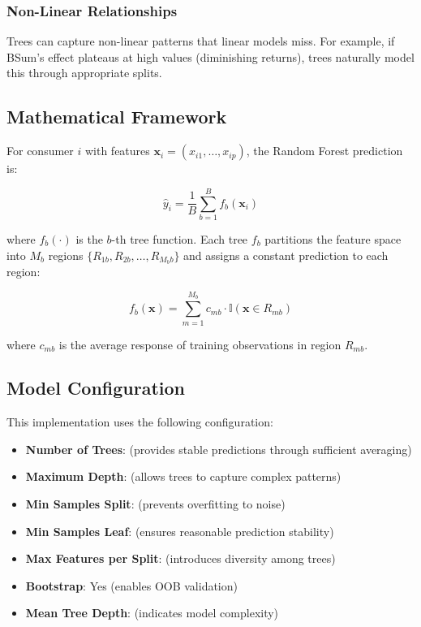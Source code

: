 \subsubsection{Non-Linear Relationships}

Trees can capture non-linear patterns that linear models miss. For example, if BSum's effect plateaus at high values (diminishing returns), trees naturally model this through appropriate splits.

\subsection{Mathematical Framework}

For consumer $i$ with features $\mathbf{x}_i = (x_{i1}, \ldots, x_{ip})$, the Random Forest prediction is:

\begin{equation}
\hat{y}_i = \frac{1}{B} \sum_{b=1}^{B} f_b(\mathbf{x}_i)
\end{equation}

where $f_b(\cdot)$ is the $b$-th tree function. Each tree $f_b$ partitions the feature space into $M_b$ regions $\{R_{1b}, R_{2b}, \ldots, R_{M_b b}\}$ and assigns a constant prediction to each region:

\begin{equation}
f_b(\mathbf{x}) = \sum_{m=1}^{M_b} c_{mb} \cdot \mathbb{I}(\mathbf{x} \in R_{mb})
\end{equation}

where $c_{mb}$ is the average response of training observations in region $R_{mb}$.

\subsection{Model Configuration}

This implementation uses the following configuration:

\begin{itemize}
    \item \textbf{Number of Trees}: \ModelNineNTrees{} (provides stable predictions through sufficient averaging)
    \item \textbf{Maximum Depth}: \ModelNineMaxDepth{} (allows trees to capture complex patterns)
    \item \textbf{Min Samples Split}: \ModelNineMinSamplesSplit{} (prevents overfitting to noise)
    \item \textbf{Min Samples Leaf}: \ModelNineMinSamplesLeaf{} (ensures reasonable prediction stability)
    \item \textbf{Max Features per Split}: \ModelNineMaxFeatures{} (introduces diversity among trees)
    \item \textbf{Bootstrap}: Yes (enables OOB validation)
    \item \textbf{Mean Tree Depth}: \ModelNineMeanTreeDepth{} (indicates model complexity)
\end{itemize}


